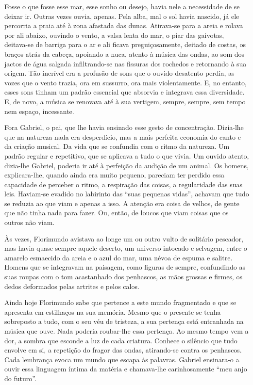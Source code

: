 Fosse o que fosse esse mar, esse sonho ou desejo, havia nele a
necessidade de se deixar ir. Outras vezes ouvia, apenas. Pela alba, mal
o sol havia nascido, já ele percorria a praia até à zona afastada das
dunas. Atirava-se para a areia e rolava por ali abaixo, ouvindo o vento,
a valsa lenta do mar, o piar das gaivotas, deitava-se de barriga para o
ar e ali ficava preguiçosamente, deitado de costas, os braços atrás da
cabeça, apoiando a nuca, atento à música das ondas, ao som dos jactos de
água salgada infiltrando-se nas fissuras dos rochedos e retornando à sua
origem. Tão incrível era a profusão de sons que o ouvido desatento
perdia, as vozes que o vento trazia, ora em sussurro, ora mais
violentamente. E, no entanto, esses sons tinham um padrão essencial que
absorvia e integrava essa diversidade. E, de novo, a música se renovava
até à sua vertigem, sempre, sempre, sem tempo nem espaço, incessante.

Fora Gabriel, o pai, que lhe havia ensinado esse gesto de concentração.
Dizia-lhe que na natureza nada era desperdício, mas a mais perfeita
economia do canto e da criação musical. Da vida que se confundia com o
ritmo da natureza. Um padrão regular e repetitivo, que se aplicava a
tudo o que vivia. Um ouvido atento, dizia-lhe Gabriel, poderia ir até à
perfeição da audição de um animal. Os homens, explicara-lhe, quando
ainda era muito pequeno, pareciam ter perdido essa capacidade de
perceber o ritmo, a respiração das coisas, a regularidade das suas leis.
Haviam-se evadido no labirinto das ``suas pequenas vidas'', achavam que
tudo se reduzia ao que viam e apenas a isso. A atenção era coisa de
velhos, de gente que não tinha nada para fazer. Ou, então, de loucos que
viam coisas que os outros não viam.

Às vezes, Florimundo avistava ao longe um ou outro vulto de solitário
pescador, mas havia quase sempre aquele deserto, um universo intocado e
selvagem, entre o amarelo esmaecido da areia e o azul do mar, uma névoa
de espuma e salitre. Homens que se integravam na paisagem, como figuras
de sempre, confundindo as suas roupas com o tom acastanhado dos
penhascos, as mãos grossas e firmes, os dedos deformados pelas artrites
e pelos calos.

Ainda hoje Florimundo sabe que pertence a este mundo fragmentado e que
se apresenta em estilhaços na sua memória. Mesmo que o presente se tenha
sobreposto a tudo, com o seu véu de tristeza, a sua pertença está
entranhada na música que ouve. Nada poderia roubar-lhe essa pertença. Ao
mesmo tempo vem a dor, a sombra que esconde a luz de cada criatura.
Conhece o silêncio que tudo envolve em si, a repetição do fragor das
ondas, atirando-se contra os penhascos. Cada lembrança evoca um mundo
que escapa às palavras. Gabriel ensinara-o a ouvir essa linguagem íntima
da matéria e chamava-lhe carinhosamente ``meu anjo do futuro''.

